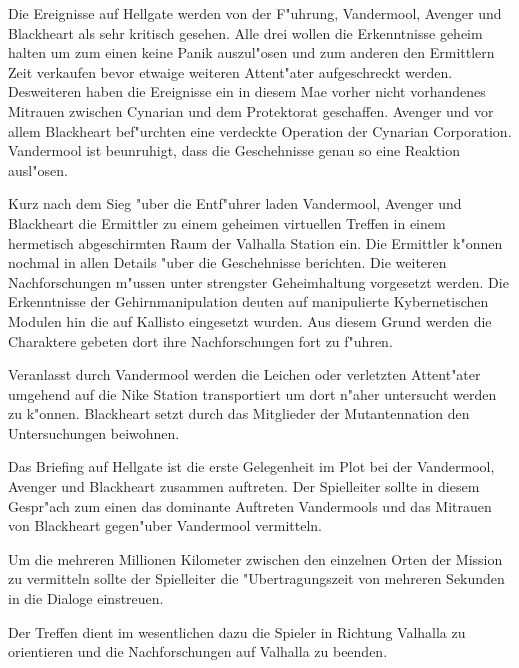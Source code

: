 
Die Ereignisse auf Hellgate werden von der F"uhrung, Vandermool, Avenger und Blackheart als sehr kritisch gesehen. Alle drei wollen die Erkenntnisse geheim halten um zum einen keine Panik auszul"osen und zum anderen den Ermittlern Zeit verkaufen bevor etwaige weiteren Attent"ater aufgeschreckt werden. Desweiteren haben die Ereignisse ein in diesem Ma\3e vorher nicht vorhandenes Mi\3trauen zwischen Cynarian und dem Protektorat geschaffen. Avenger und vor allem Blackheart bef"urchten eine verdeckte Operation der Cynarian Corporation. Vandermool ist beunruhigt, dass die Geschehnisse genau so eine Reaktion ausl"osen.

Kurz nach dem Sieg "uber die Entf"uhrer laden Vandermool, Avenger und Blackheart die Ermittler zu einem geheimen virtuellen Treffen in einem hermetisch abgeschirmten Raum der Valhalla Station ein. Die Ermittler k"onnen nochmal in allen Details "uber die Geschehnisse berichten. Die weiteren Nachforschungen m"ussen unter strengster Geheimhaltung vorgesetzt werden. Die Erkenntnisse der Gehirnmanipulation deuten auf manipulierte Kybernetischen Modulen hin die auf Kallisto eingesetzt wurden. Aus diesem Grund werden die Charaktere gebeten dort ihre Nachforschungen fort zu f"uhren.

Veranlasst durch Vandermool werden die Leichen oder verletzten Attent"ater umgehend auf die Nike Station transportiert um dort n"aher untersucht werden zu k"onnen. Blackheart setzt durch das Mitglieder der Mutantennation den Untersuchungen beiwohnen.

\begin{remarks}
	Das Briefing auf Hellgate ist die erste Gelegenheit im Plot bei der Vandermool, Avenger und Blackheart zusammen auftreten. Der Spielleiter sollte in diesem Gespr"ach zum einen das dominante Auftreten Vandermools und das Mi\3trauen von Blackheart gegen"uber Vandermool vermitteln.

	Um die mehreren Millionen Kilometer zwischen den einzelnen Orten der Mission zu vermitteln sollte der Spielleiter die "Ubertragungszeit von mehreren Sekunden in die Dialoge einstreuen.

	Der Treffen dient im wesentlichen dazu die Spieler in Richtung Valhalla zu orientieren und die Nachforschungen auf Valhalla zu beenden.
\end{remarks}